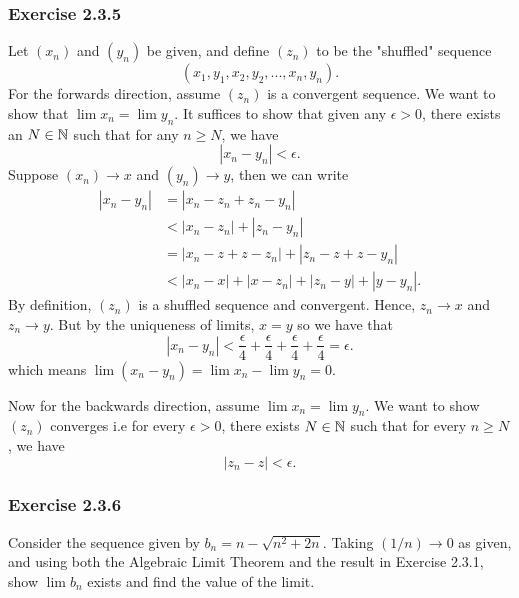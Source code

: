 \subsubsection{Exercise 2.3.5}
Let \( (x_n)\) and \( (y_n)\) be given, and define \( (z_n)\) to be the "shuffled" sequence \[ (x_1, y_1, x_2, y_2 ,...,x_n, y_n).\] 
For the forwards direction, assume \( (z_n) \) is a convergent sequence. We want to show that \( \lim x_n = \lim y_n \). It suffices to show that given any \( \epsilon > 0\), there exists an \( N \in \mathbb{N} \) such that for any \( n \geq N \), we have 
\[ | x_n - y_n | < \epsilon.\]
Suppose \( (x_n) \to x\) and \( (y_n) \to y\), then we can write 
\begin{align*}
   | x_n - y_n  | &= | x_n - z_n + z_n - y_n |  \\
                  &< | x_n - z_n | + | z_n - y_n | \\  
                  &= | x_n - z + z - z_n | + | z_n - z + z - y_n | \\
                  &< | x_n - x | + | x - z_n | + | z_n - y | + | y - y_n |. \tag{1} 
\end{align*}
By definition, \( (z_n)\) is a shuffled sequence and convergent. Hence, \( z_n \to x \) and \( z_n \to y\). But by the uniqueness of limits, \( x = y\) so we have that 
\[ | x_n - y_n | < \frac{ \epsilon }{4} + \frac{ \epsilon }{4} +  \frac{ \epsilon }{4} + \frac{ \epsilon }{4} = \epsilon.\]
which means \( \lim (x_n - y_n) = \lim x_n - \lim y_n = 0\). 

Now for the backwards direction, assume \( \lim x_n = \lim y_n\). We want to show \( (z_n)\) converges i.e for every \( \epsilon> 0\), there exists \( N \in \mathbb{N} \) such that for every \( n \geq N \), we have 
\[ | z_n - z | < \epsilon.\]

\subsubsection{Exercise 2.3.6} 
Consider the sequence given by \( b_n = n - \sqrt{n^2 + 2n}\). Taking \( (1 / n ) \to 0\) as given, and using both the Algebraic Limit Theorem and the result in Exercise 2.3.1, show \( \lim b_n \) exists and find the value of the limit.

